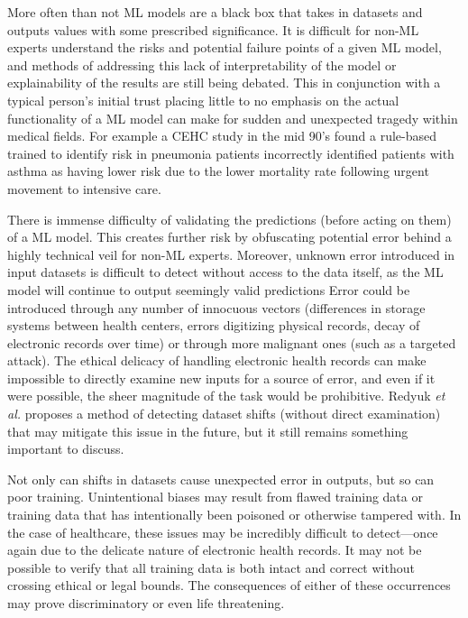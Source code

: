 \documentclass[]{article}
\begin{document}
		More often than not ML models are a black box that takes in datasets and outputs values with some prescribed significance. It is difficult for non-ML experts understand the risks and potential failure points of a given ML model, and methods of addressing this lack of interpretability of the model or explainability of the results are still being debated.\cite{10.1145/2858036.2858529, 10.1145/3328519.3329126} This in conjunction with a typical person's initial trust placing little to no emphasis on the actual functionality of a ML model\cite{siau2018building} can make for sudden and unexpected tragedy within medical fields. For example a CEHC study in the mid 90's found a rule-based trained to identify risk in pneumonia patients incorrectly identified patients with asthma as having lower risk due to the lower mortality rate following urgent movement to intensive care.\cite{caruana2015intelligible}

		There is immense difficulty of validating the predictions (before acting on them) of a ML model. This creates further risk by obfuscating potential error behind a highly technical veil for non-ML experts. Moreover, unknown error introduced in input datasets is difficult to detect without access to the data itself, as the ML model will continue to output seemingly valid predictions\cite{10.1145/3328519.3329126} Error could be introduced through any number of innocuous vectors (differences in storage systems between health centers, errors digitizing physical records, decay of electronic records over time) or through more malignant ones (such as a targeted attack). The ethical delicacy of handling electronic health records can make impossible to directly examine new inputs for a source of error, and even if it were possible, the sheer magnitude of the task would be prohibitive. Redyuk \emph{et al.} proposes a method of detecting dataset shifts (without direct examination) that may mitigate this issue in the future\cite{10.1145/3328519.3329126}, but it still remains something important to discuss.

		Not only can shifts in datasets cause unexpected error in outputs, but so can poor training. Unintentional biases may result from flawed training data\cite{7912315} or training data that has intentionally been poisoned or otherwise tampered with\cite{6868201}. In the case of healthcare, these issues may be incredibly difficult to detect---once again due to the delicate nature of electronic health records. It may not be possible to verify that all training data is both intact and correct without crossing ethical or legal bounds. The consequences of either of these occurrences may prove discriminatory or even life threatening.
\end{document}
